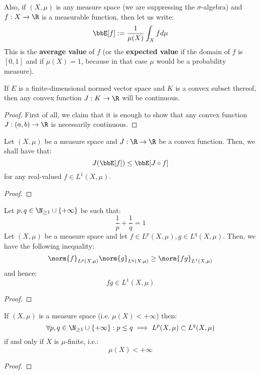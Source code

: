         Also, if $(X, \mu)$ is any measure space (we are suppressing the $\sigma$-algebra) and $f: X \to \R$ is a measurable function, then let us write:
            $$\bbE[f] := \frac{1}{\mu(X)} \int_X f d\mu$$
        This is the \textbf{average value} of $f$ (or the \textbf{expected value} if the domain of $f$ is $[0, 1]$ and if $\mu(X) = 1$, because in that case $\mu$ would be a probability measure).
        \begin{lemma}
            If $E$ is a finite-dimensional normed vector space and $K$ is a convex subset thereof, then any convex function $J: K \to \R$ will be continuous. 
        \end{lemma}
            \begin{proof}
                First of all, we claim that it is enough to show that any convex function $J: (a, b) \to \R$ is necessarily continuous. 
            \end{proof}
        \begin{lemma} \label{lemma: jensen_inequality}
            Let $(X, \mu)$ be a measure space and $J: \R \to \R$ be a convex function. Then, we shall have that:
                $$J( \bbE[f] ) \leq \bbE[ J \circ f ]$$
            for any real-valued $f \in L^1(X, \mu)$. 
        \end{lemma}
            \begin{proof}
                
            \end{proof}
        \begin{lemma}
            Let $p, q \in \N_{\geq 1} \cup \{+\infty\}$ be such that:
                $$\frac1p + \frac1q = 1$$
            Let $(X, \mu)$ be a measure space and let $f \in L^p(X, \mu), g \in L^q(X, \mu)$. Then, we have the following inequality:
                $$\norm{f}_{L^p(X, \mu)} \norm{g}_{L^q(X, \mu)} \geq \norm{fg}_{L^1(X, \mu)}$$
            and hence:
                $$fg \in L^1(X, \mu)$$
        \end{lemma}
            \begin{proof}
            \end{proof}
        \begin{corollary}
            If $(X, \mu)$ is a measure space (i.e. $\mu(X) < +\infty$) then:
                $$\forall p, q \in \N_{\geq 1} \cup \{+\infty\}: p \leq q \implies L^p(X, \mu) \subset L^q(X, \mu)$$
            if and only if $X$ is $\mu$-finite, i.e.:
                $$\mu(X) < +\infty$$ 
        \end{corollary}
            \begin{proof}
                
            \end{proof}

